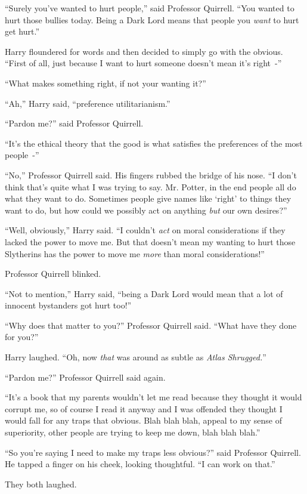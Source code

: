 ``Surely you've wanted to hurt people,'' said Professor Quirrell. ``You wanted to hurt those bullies today. Being a Dark Lord means that people you \emph{want} to hurt get hurt.''

Harry floundered for words and then decided to simply go with the obvious. ``First of all, just because I want to hurt someone doesn't mean it's right~-''

``What makes something right, if not your wanting it?''

``Ah,'' Harry said, ``preference utilitarianism.''

``Pardon me?'' said Professor Quirrell.

``It's the ethical theory that the good is what satisfies the preferences of the most people~-''

``No,'' Professor Quirrell said. His fingers rubbed the bridge of his nose. ``I don't think that's quite what I was trying to say. Mr. Potter, in the end people all do what they want to do. Sometimes people give names like `right' to things they want to do, but how could we possibly act on anything \emph{but} our own desires?''

``Well, obviously,'' Harry said. ``I couldn't \emph{act} on moral considerations if they lacked the power to move me. But that doesn't mean my wanting to hurt those Slytherins has the power to move me \emph{more} than moral considerations!''

Professor Quirrell blinked.

``Not to mention,'' Harry said, ``being a Dark Lord would mean that a lot of innocent bystanders got hurt too!''

``Why does that matter to you?'' Professor Quirrell said. ``What have they done for you?''

Harry laughed. ``Oh, now \emph{that} was around as subtle as \emph{Atlas Shrugged.}''

``Pardon me?'' Professor Quirrell said again.

``It's a book that my parents wouldn't let me read because they thought it would corrupt me, so of course I read it anyway and I was offended they thought I would fall for any traps that obvious. Blah blah blah, appeal to my sense of superiority, other people are trying to keep me down, blah blah blah.''

``So you're saying I need to make my traps less obvious?'' said Professor Quirrell. He tapped a finger on his cheek, looking thoughtful. ``I can work on that.''

They both laughed.

